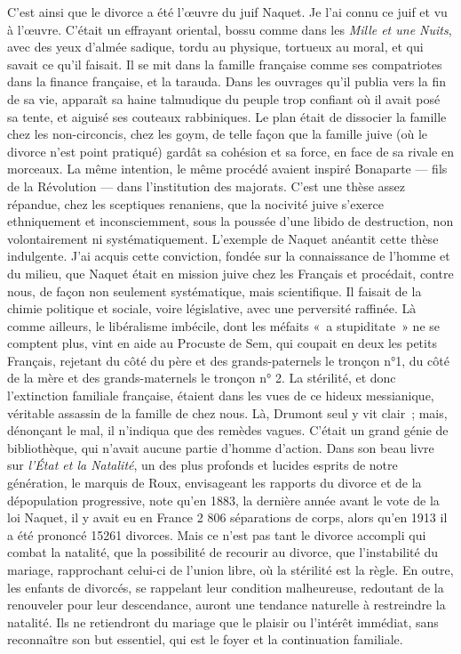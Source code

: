 \documentclass[french,twoside]{book} %
\begin{document}
C’est ainsi que le divorce a été l’œuvre du juif Naquet. Je l’ai connu ce juif et vu à l’œuvre. C’était un effrayant oriental, bossu comme dans les {\itshape Mille et une Nuits}, avec des yeux d’almée sadique, tordu au physique, tortueux au moral, et qui savait ce qu’il faisait. Il se mit dans la famille française comme ses compatriotes dans la finance française, et la tarauda. Dans les ouvrages qu’il publia vers la fin de sa vie, apparaît sa haine talmudique du peuple trop confiant où il avait posé sa tente, et aiguisé ses couteaux rabbiniques. Le plan était de dissocier la famille chez les non-circoncis, chez les goym, de telle façon que la famille juive (où le divorce n’est point pratiqué) gardât sa cohésion et sa force, en face de sa rivale en morceaux. La même intention, le même procédé avaient inspiré Bonaparte — fils de la Révolution — dans l’institution des majorats. C’est une thèse assez répandue, chez les sceptiques renaniens, que la nocivité juive s’exerce ethniquement et inconsciemment, sous la poussée d’une libido de destruction, non volontairement ni systématiquement. L’exemple de Naquet anéantit cette thèse indulgente. J’ai acquis cette conviction, fondée sur la connaissance de l’homme et du milieu, que Naquet était en mission juive chez les Français et procédait, contre nous, de façon non seulement systématique, mais scientifique. Il faisait de la chimie politique et sociale, voire législative, avec une perversité raffinée. Là comme ailleurs, le libéralisme imbécile, dont les méfaits « a stupiditate » ne se comptent plus, vint en aide au Procuste de Sem, qui coupait en deux les petits Français, rejetant du côté du père et des grands-paternels le tronçon n°1, du côté de la mère et des grands-maternels le tronçon n° 2. La stérilité, et donc l’extinction familiale française, étaient dans les vues de ce hideux messianique, véritable assassin de la famille de chez nous. Là, Drumont seul y vit clair ; mais, dénonçant le mal, il n’indiqua que des remèdes vagues. C’était un grand génie de bibliothèque, qui n’avait aucune partie d’homme d’action. Dans son beau livre sur {\itshape l’État et la Natalité}, un des plus profonds et lucides esprits de notre génération, le marquis de Roux, envisageant les rapports du divorce et de la dépopulation progressive, note qu’en 1883, la dernière année avant le vote de la loi Naquet, il y avait eu en France 2 806 séparations de corps, alors qu’en 1913 il a été prononcé 15261 divorces. Mais ce n’est pas tant le divorce accompli qui combat la natalité, que la possibilité de recourir au divorce, que l’instabilité du mariage, rapprochant celui-ci de l’union libre, où la stérilité est la règle. En outre, les enfants de divorcés, se rappelant leur condition malheureuse, redoutant de la renouveler pour leur descendance, auront une tendance naturelle à restreindre la natalité. Ils ne retiendront du mariage que le plaisir ou l’intérêt immédiat, sans reconnaître son but essentiel, qui est le foyer et la continuation familiale.\par
\end{document}

